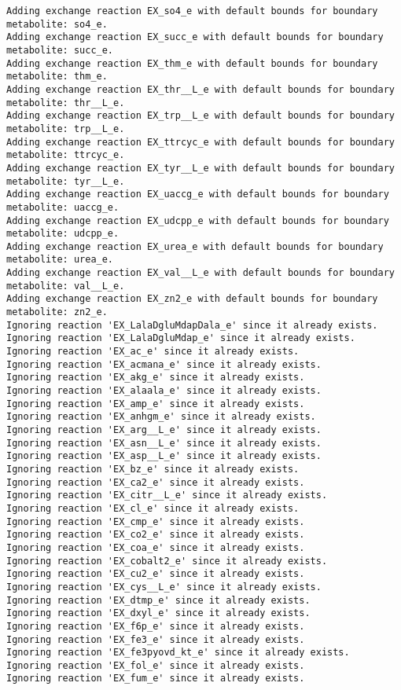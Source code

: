 \documentclass[
  letterpaper,
  DIV=11,
  numbers=noendperiod]{scrartcl}
\begin{document}
\begin{verbatim}
Adding exchange reaction EX_so4_e with default bounds for boundary metabolite: so4_e.
Adding exchange reaction EX_succ_e with default bounds for boundary metabolite: succ_e.
Adding exchange reaction EX_thm_e with default bounds for boundary metabolite: thm_e.
Adding exchange reaction EX_thr__L_e with default bounds for boundary metabolite: thr__L_e.
Adding exchange reaction EX_trp__L_e with default bounds for boundary metabolite: trp__L_e.
Adding exchange reaction EX_ttrcyc_e with default bounds for boundary metabolite: ttrcyc_e.
Adding exchange reaction EX_tyr__L_e with default bounds for boundary metabolite: tyr__L_e.
Adding exchange reaction EX_uaccg_e with default bounds for boundary metabolite: uaccg_e.
Adding exchange reaction EX_udcpp_e with default bounds for boundary metabolite: udcpp_e.
Adding exchange reaction EX_urea_e with default bounds for boundary metabolite: urea_e.
Adding exchange reaction EX_val__L_e with default bounds for boundary metabolite: val__L_e.
Adding exchange reaction EX_zn2_e with default bounds for boundary metabolite: zn2_e.
Ignoring reaction 'EX_LalaDgluMdapDala_e' since it already exists.
Ignoring reaction 'EX_LalaDgluMdap_e' since it already exists.
Ignoring reaction 'EX_ac_e' since it already exists.
Ignoring reaction 'EX_acmana_e' since it already exists.
Ignoring reaction 'EX_akg_e' since it already exists.
Ignoring reaction 'EX_alaala_e' since it already exists.
Ignoring reaction 'EX_amp_e' since it already exists.
Ignoring reaction 'EX_anhgm_e' since it already exists.
Ignoring reaction 'EX_arg__L_e' since it already exists.
Ignoring reaction 'EX_asn__L_e' since it already exists.
Ignoring reaction 'EX_asp__L_e' since it already exists.
Ignoring reaction 'EX_bz_e' since it already exists.
Ignoring reaction 'EX_ca2_e' since it already exists.
Ignoring reaction 'EX_citr__L_e' since it already exists.
Ignoring reaction 'EX_cl_e' since it already exists.
Ignoring reaction 'EX_cmp_e' since it already exists.
Ignoring reaction 'EX_co2_e' since it already exists.
Ignoring reaction 'EX_coa_e' since it already exists.
Ignoring reaction 'EX_cobalt2_e' since it already exists.
Ignoring reaction 'EX_cu2_e' since it already exists.
Ignoring reaction 'EX_cys__L_e' since it already exists.
Ignoring reaction 'EX_dtmp_e' since it already exists.
Ignoring reaction 'EX_dxyl_e' since it already exists.
Ignoring reaction 'EX_f6p_e' since it already exists.
Ignoring reaction 'EX_fe3_e' since it already exists.
Ignoring reaction 'EX_fe3pyovd_kt_e' since it already exists.
Ignoring reaction 'EX_fol_e' since it already exists.
Ignoring reaction 'EX_fum_e' since it already exists.

\end{verbatim}
\end{document}
